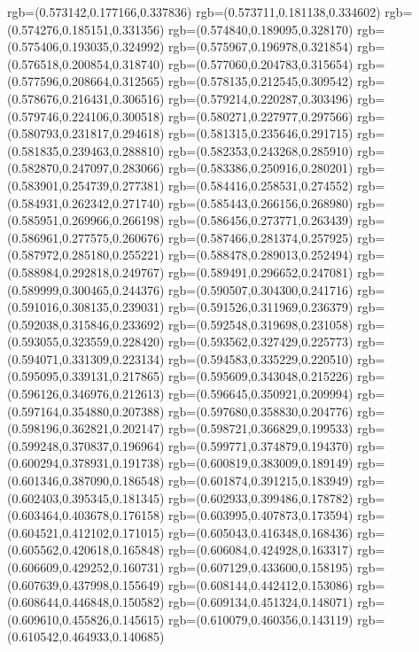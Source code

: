 {{{			rgb=(0.573142,0.177166,0.337836)
			rgb=(0.573711,0.181138,0.334602)
			rgb=(0.574276,0.185151,0.331356)
			rgb=(0.574840,0.189095,0.328170)
			rgb=(0.575406,0.193035,0.324992)
			rgb=(0.575967,0.196978,0.321854)
			rgb=(0.576518,0.200854,0.318740)
			rgb=(0.577060,0.204783,0.315654)
			rgb=(0.577596,0.208664,0.312565)
			rgb=(0.578135,0.212545,0.309542)
			rgb=(0.578676,0.216431,0.306516)
			rgb=(0.579214,0.220287,0.303496)
			rgb=(0.579746,0.224106,0.300518)
			rgb=(0.580271,0.227977,0.297566)
			rgb=(0.580793,0.231817,0.294618)
			rgb=(0.581315,0.235646,0.291715)
			rgb=(0.581835,0.239463,0.288810)
			rgb=(0.582353,0.243268,0.285910)
			rgb=(0.582870,0.247097,0.283066)
			rgb=(0.583386,0.250916,0.280201)
			rgb=(0.583901,0.254739,0.277381)
			rgb=(0.584416,0.258531,0.274552)
			rgb=(0.584931,0.262342,0.271740)
			rgb=(0.585443,0.266156,0.268980)
			rgb=(0.585951,0.269966,0.266198)
			rgb=(0.586456,0.273771,0.263439)
			rgb=(0.586961,0.277575,0.260676)
			rgb=(0.587466,0.281374,0.257925)
			rgb=(0.587972,0.285180,0.255221)
			rgb=(0.588478,0.289013,0.252494)
			rgb=(0.588984,0.292818,0.249767)
			rgb=(0.589491,0.296652,0.247081)
			rgb=(0.589999,0.300465,0.244376)
			rgb=(0.590507,0.304300,0.241716)
			rgb=(0.591016,0.308135,0.239031)
			rgb=(0.591526,0.311969,0.236379)
			rgb=(0.592038,0.315846,0.233692)
			rgb=(0.592548,0.319698,0.231058)
			rgb=(0.593055,0.323559,0.228420)
			rgb=(0.593562,0.327429,0.225773)
			rgb=(0.594071,0.331309,0.223134)
			rgb=(0.594583,0.335229,0.220510)
			rgb=(0.595095,0.339131,0.217865)
			rgb=(0.595609,0.343048,0.215226)
			rgb=(0.596126,0.346976,0.212613)
			rgb=(0.596645,0.350921,0.209994)
			rgb=(0.597164,0.354880,0.207388)
			rgb=(0.597680,0.358830,0.204776)
			rgb=(0.598196,0.362821,0.202147)
			rgb=(0.598721,0.366829,0.199533)
			rgb=(0.599248,0.370837,0.196964)
			rgb=(0.599771,0.374879,0.194370)
			rgb=(0.600294,0.378931,0.191738)
			rgb=(0.600819,0.383009,0.189149)
			rgb=(0.601346,0.387090,0.186548)
			rgb=(0.601874,0.391215,0.183949)
			rgb=(0.602403,0.395345,0.181345)
			rgb=(0.602933,0.399486,0.178782)
			rgb=(0.603464,0.403678,0.176158)
			rgb=(0.603995,0.407873,0.173594)
			rgb=(0.604521,0.412102,0.171015)
			rgb=(0.605043,0.416348,0.168436)
			rgb=(0.605562,0.420618,0.165848)
			rgb=(0.606084,0.424928,0.163317)
			rgb=(0.606609,0.429252,0.160731)
			rgb=(0.607129,0.433600,0.158195)
			rgb=(0.607639,0.437998,0.155649)
			rgb=(0.608144,0.442412,0.153086)
			rgb=(0.608644,0.446848,0.150582)
			rgb=(0.609134,0.451324,0.148071)
			rgb=(0.609610,0.455826,0.145615)
			rgb=(0.610079,0.460356,0.143119)
			rgb=(0.610542,0.464933,0.140685)
}}}
